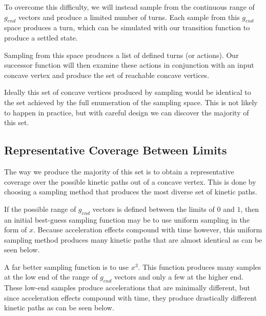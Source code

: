 To overcome this difficulty, we will instead sample from the continuous range of $g_{end}$ vectors and produce a limited number of turns. Each sample from this $g_{end}$ space produces a turn, which can be simulated with our transition function to produce a settled state.

Sampling from this space produces a list of defined turns (or actions). Our successor function will then examine these actions in conjunction with an input concave vertex and produce the set of reachable concave vertices.

Ideally this set of concave vertices produced by sampling would be identical to the set achieved by the full enumeration of the sampling space. This is not likely to happen in practice, but with careful design we can discover the majority of this set.

	\subsection{Representative Coverage Between Limits}

The way we produce the majority of this set is to obtain a representative coverage over the possible kinetic paths out of a concave vertex. This is done by choosing a sampling method that produces the most diverse set of kinetic paths.

If the possible range of $g_{end}$ vectors is defined between the limits of $0$ and $1$, then an initial best-guess sampling function may be to use uniform sampling in the form of $x$. Because acceleration effects compound with time however, this uniform sampling method produces many kinetic paths that are almost identical as can be seen below.


A far better sampling function is to use $x^3$. This function produces many samples at the low end of the range of $g_{end}$ vectors and only a few at the higher end. These low-end samples produce accelerations that are minimally different, but since acceleration effects compound with time, they produce drastically different kinetic paths as can be seen below.


